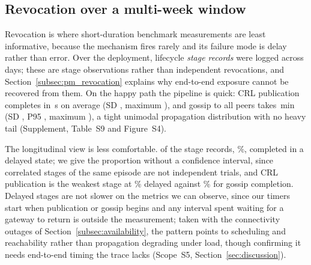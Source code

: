 \documentclass[a4paper,fleqn]{cas-sc}
\begin{document}
\subsection{Revocation over a multi-week window}
\label{subsec:revocation}

Revocation is where short-duration benchmark measurements are least
informative, because the mechanism fires rarely and its failure mode is
delay rather than error.
Over the deployment, \RevEvents{} lifecycle \emph{stage records} were
logged across \RevDays{} days; these are stage observations rather than
independent revocations, and Section~\ref{subsec:pm_revocation} explains
why end-to-end exposure cannot be recovered from them. On the happy path
the pipeline is quick: CRL publication completes in \RevPubMean\,s on
average (SD \RevPubSD, maximum \RevPubMax), and gossip to all peers takes
\RevGossipMean\,min (SD \RevGossipSD, P95 \RevGossipPNinetyFive, maximum
\RevGossipMax), a tight unimodal propagation distribution with no heavy
tail (Supplement, Table~S9 and Figure~S4).

The longitudinal view is less comfortable. \RevDelayed{} of the
\RevEvents{} stage records, \RevDelayedPct\%, completed in a delayed
state; we give the proportion without a confidence interval, since
correlated stages of the same episode are not independent trials, and CRL
publication is the weakest stage at \RevWorstTypePct\% delayed against
\RevBestTypePct\% for gossip completion. Delayed stages are not slower on
the metrics we can observe, since our timers start when publication or
gossip begins and any interval spent waiting for a gateway to return is
outside the measurement; taken with the connectivity outages of
Section~\ref{subsec:availability}, the pattern points to scheduling and
reachability rather than propagation degrading under load, though
confirming it needs end-to-end timing the trace lacks (Scope~S5,
Section~\ref{sec:discussion}).
\end{document}
